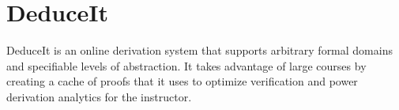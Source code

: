 \documentclass{sigchi}
\begin{document}
% 
% 
% 

\section{DeduceIt}
DeduceIt is an online derivation system that supports arbitrary formal domains and specifiable levels of abstraction. It takes advantage of large courses by creating a cache of proofs that it uses to optimize verification and power derivation analytics for the instructor.

\end{document}
